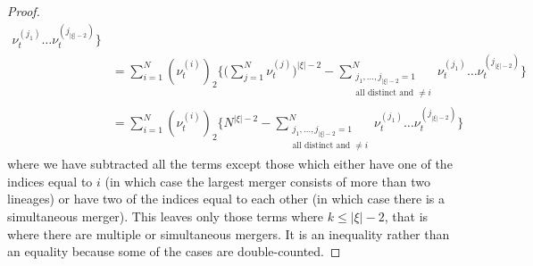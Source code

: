 \begin{proof}
\begin{align*}
        \nu_t^{ ( j_1 ) } \ldots \nu_t^{ ( j_{ | \xi | - 2 } ) } \Bigg\} \\
&= \sum_{ i = 1 }^N ( \nu_t^{ ( i ) } )_2 
        \Bigg\{ \Bigg( \sum_{j=1}^N \nu_t^{(j)} \Bigg)^{|\xi|-2}
        - \sum_{ \substack{ j_1, \ldots, j_{ | \xi | - 2 } = 1 
        \\ \text{all distinct and } \neq i } }^N 
        \nu_t^{ ( j_1 ) } \ldots \nu_t^{ ( j_{ | \xi | - 2 } ) } \Bigg\} \\
&= \sum_{ i = 1 }^N ( \nu_t^{ ( i ) } )_2 
        \Bigg\{ N^{|\xi|-2}
        - \sum_{ \substack{ j_1, \ldots, j_{ | \xi | - 2 } = 1 
        \\ \text{all distinct and } \neq i } }^N 
        \nu_t^{ ( j_1 ) } \ldots \nu_t^{ ( j_{ | \xi | - 2 } ) } \Bigg\} 
\end{align*}
where we have subtracted all the terms except those which either have one of the indices equal to $i$ (in which case the largest merger consists of more than two lineages) or have two of the indices equal to each other (in which case there is a simultaneous merger).
This leaves only those terms where $k\leq |\xi|-2$, that is where there are multiple or simultaneous mergers. It is an inequality rather than an equality because some of the cases are double-counted.


\end{proof}
